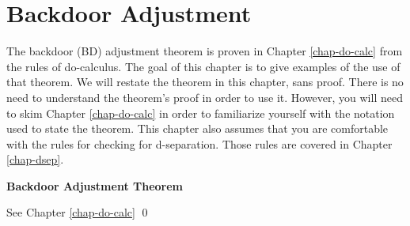 \chapter{Backdoor Adjustment}
\label{chap-bdoor}

The backdoor (BD) adjustment
theorem is proven in 
Chapter \ref{chap-do-calc}
from the rules of do-calculus.
The goal 
of this chapter is
to give examples
of the use of that
theorem.
We will restate
the theorem in this chapter,
sans proof.
There is no need
to understand the
theorem's
proof in order to use it.
However, you
will
need to skim Chapter \ref{chap-do-calc}
in order to familiarize 
yourself with
the notation used to state the 
theorem.
This chapter also assumes
that you are comfortable 
with the  rules 
for checking for d-separation. Those rules
are covered in Chapter \ref{chap-dsep}.



\bdoordef
\begin{claim} {\bf Backdoor Adjustment
 Theorem}

\bdoorclaim
\end{claim}
\proof 
See Chapter \ref{chap-do-calc}
\qed

